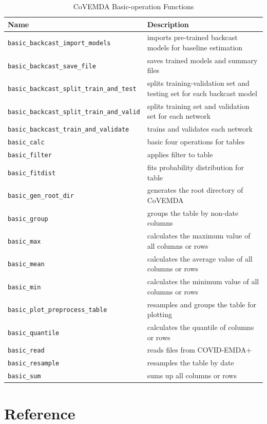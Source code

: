 \documentclass[10pt]{article}
\newcommand{\covemda}{CoVEMDA}
\numberwithin{equation}{section}
\numberwithin{table}{section}
\numberwithin{figure}{section}
\begin{document}
\begin{appendices}
\begin{table}[!ht]
    \centering
    \begin{threeparttable}
    \caption{\covemda{} Basic-operation Functions}
    \label{tab:basic_op_func}
    \footnotesize
    \begin{tabular}{ll}
        \toprule
        Name & Description \\
        \midrule
        \verb!basic_backcast_import_models! & imports pre-trained backcast models for baseline estimation \\
        \verb!basic_backcast_save_file! & saves trained models and summary files \\
        \verb!basic_backcast_split_train_and_test! & splits training-validation set and testing set for each backcast model \\
        \verb!basic_backcast_split_train_and_valid! & splits training set and validation set for each network \\
        \verb!basic_backcast_train_and_validate! & trains and validates each network \\
        \verb!basic_calc! & basic four operations for tables \\
        \verb!basic_filter! & applies filter to table \\
        \verb!basic_fitdist! & fits probability distribution for table \\
        \verb!basic_gen_root_dir! & generates the root directory of \covemda{} \\
        \verb!basic_group! & groups the table by non-date columns \\
        \verb!basic_max! & calculates the maximum value of all columns or rows \\
        \verb!basic_mean! & calculates the average value of all columns or rows \\
        \verb!basic_min! & calculates the minimum value of all columns or rows \\
        \verb!basic_plot_preprocess_table! & resamples and groups the table for plotting \\
        \verb!basic_quantile! & calculates the quantile of columns or rows \\
        \verb!basic_read! & reads files from COVID-EMDA+ \\
        \verb!basic_resample! & resamples the table by date \\
        \verb!basic_sum! & sums up all columns or rows \\
        \bottomrule
    \end{tabular}
    \end{threeparttable}
\end{table}

\end{appendices}




\newpage
\section*{Reference} \label{sec:ref}
\end{document}
